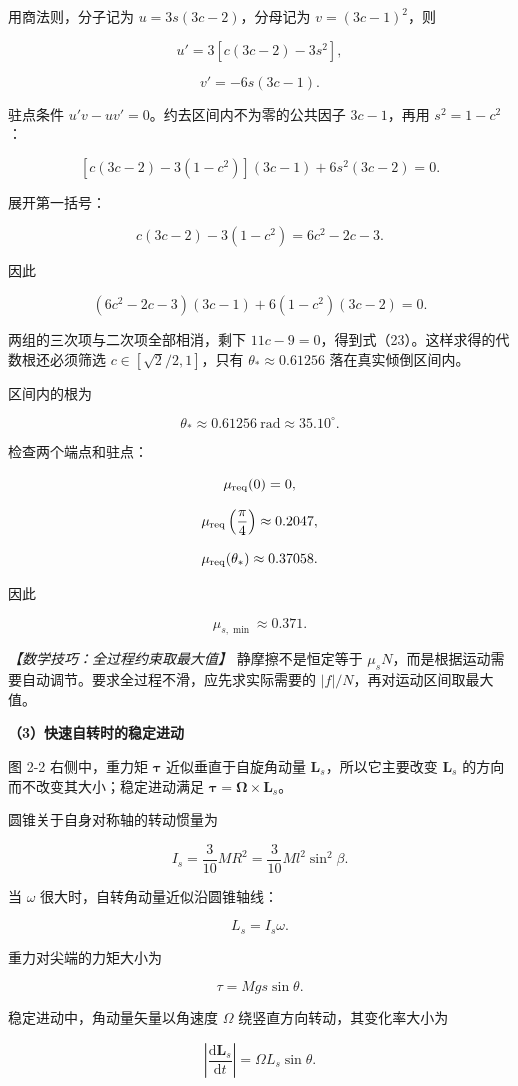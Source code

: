 \documentclass[12pt,a4paper,UTF8]{ctexart}
\begin{document}
用商法则，分子记为 \(u=3s(3c-2)\)，分母记为 \(v=(3c-1)^2\)，则

\[u'=3[c(3c-2)-3s^2],\]

\[v'=-6s(3c-1).\]

驻点条件 \(u'v-uv'=0\)。约去区间内不为零的公共因子 \(3c-1\)，再用
\(s^2=1-c^2\)：

\[[c(3c-2)-3(1-c^2)](3c-1)+6s^2(3c-2)=0.\]

展开第一括号：

\[c(3c-2)-3(1-c^2)=6c^2-2c-3.\]

因此

\[(6c^2-2c-3)(3c-1)+6(1-c^2)(3c-2)=0.\]

两组的三次项与二次项全部相消，剩下
\(11c-9=0\)，得到式（23）。这样求得的代数根还必须筛选
\(c\in[\sqrt2/2,1]\)，只有 \(\theta_*\approx0.61256\)
落在真实倾倒区间内。

区间内的根为

\[\theta_*\approx0.61256\ \mathrm{rad}
\approx35.10^\circ.\]

检查两个端点和驻点：

\[\mu_{\rm req}(0)=0,\]

\[\mu_{\rm req}\left(\frac\pi4\right)\approx0.2047,\]

\[\mu_{\rm req}(\theta_*)\approx0.37058.\]

因此

\[\boxed{\mu_{s,\min}\approx0.371}. \tag{24}\]

\emph{【数学技巧：全过程约束取最大值】} 静摩擦不是恒定等于
\(\mu_sN\)，而是根据运动需要自动调节。要求全过程不滑，应先求实际需要的
\(|f|/N\)，再对运动区间取最大值。

\textbf{（3）快速自转时的稳定进动}

图 2-2 右侧中，重力矩 \(\bm\tau\) 近似垂直于自旋角动量
\(\bm L_s\)，所以它主要改变 \(\bm L_s\)
的方向而不改变其大小；稳定进动满足 \(\bm\tau=\bm\Omega\times\bm L_s\)。

圆锥关于自身对称轴的转动惯量为

\[I_s=\frac{3}{10}MR^2
=\frac{3}{10}Ml^2\sin^2\beta. \tag{25}\]

当 \(\omega\) 很大时，自转角动量近似沿圆锥轴线：

\[L_s=I_s\omega.\]

重力对尖端的力矩大小为

\[\tau=Mgs\sin\theta.\]

稳定进动中，角动量矢量以角速度 \(\Omega\) 绕竖直方向转动，其变化率大小为

\[\left|\frac{\mathrm d\bm L_s}{\mathrm dt}\right|
=\Omega L_s\sin\theta.\]
\end{document}
